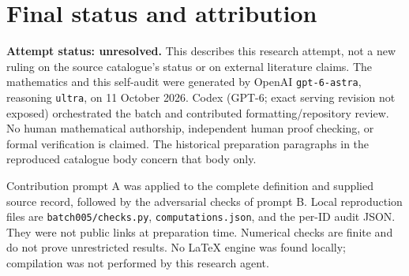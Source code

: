 \documentclass[11pt]{article}
\begin{document}
\section{Final status and attribution}
\textbf{Attempt status: unresolved.} This describes this research attempt, not a new ruling on the source catalogue's status or on external literature claims.
The mathematics and this self-audit were generated by OpenAI \texttt{gpt-6-astra}, reasoning \texttt{ultra}, on 11 October 2026. Codex (GPT-6; exact serving revision not exposed) orchestrated the batch and contributed formatting/repository review. No human mathematical authorship, independent human proof checking, or formal verification is claimed. The historical preparation paragraphs in the reproduced catalogue body concern that body only.

Contribution prompt A was applied to the complete definition and supplied source record, followed by the adversarial checks of prompt B. Local reproduction files are \texttt{batch005/checks.py}, \texttt{computations.json}, and the per-ID audit JSON. They were not public links at preparation time. Numerical checks are finite and do not prove unrestricted results. No LaTeX engine was found locally; compilation was not performed by this research agent.
\end{document}
